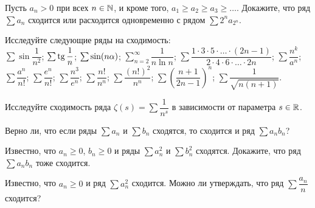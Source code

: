 \documentclass[a4paper,12pt]{article}
\begin{document}
Пусть $a_n>0$ при всех $n\in\mathbb{N}$, и кроме того, $a_1\ge a_2\ge a_3\ge\dots$. Докажите, что ряд $\sum a_n$ сходится или расходится одновременно с рядом $\sum 2^n a_{2^n}$.

Исследуйте следующие ряды на сходимость:\\
$\sum\sin\dfrac1{n^2}$;
$\sum\tg\dfrac1n$;
$\sum\sin(n\alpha)$;
$\sum\limits_{n=2}^\infty\dfrac1{n\ln n}$;
$\sum\dfrac{1\cdot3\cdot5\cdot\ldots\cdot(2n-1)}
{2\cdot4\cdot6\cdot\ldots\cdot2n}$;
$\sum\dfrac{n^k}{a^n}$;
$\sum\dfrac{a^n}{n!}$;
$\sum\dfrac{e^n}{n!}$;
$\sum\dfrac{n^3}{e^n}$;
$\sum\dfrac{n!}{n^n}$;
$\sum\dfrac{(n!)^2}{n^n}$;
$\sum\left(\dfrac{n+1}{2n-1}\right)^n$;
$\sum\dfrac{1}{\sqrt{n(n+1)}}$.

Исследуйте сходимость ряда $\zeta(s) = \sum\dfrac1{n^s}$ в зависимости от параметра $s \in \mathbb{R}$.

Верно ли, что если ряды $\sum a_n$ и $\sum b_n$ сходятся, то сходится и ряд $\sum a_nb_n$?

Известно, что $a_n\ge 0$, $b_n \ge 0$ и  ряды $\sum a_n^2$ и $\sum b_n^2$ сходятся. Докажите, что ряд $\sum a_n b_n$ тоже сходится.

Известно, что $a_n\ge 0$ и ряд $\sum a_n^2$ сходится. Можно ли утверждать, что ряд $\sum \dfrac{a_n}{n}$ сходится?

{}
\end{document}
